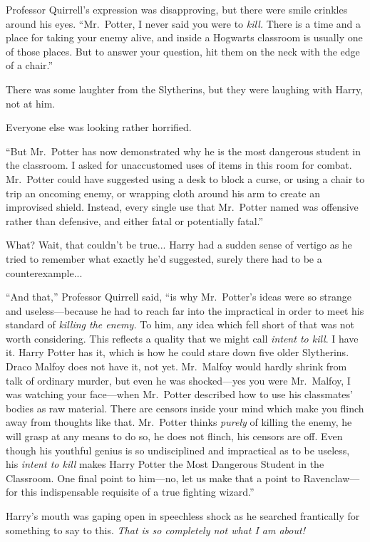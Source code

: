 Professor Quirrell’s expression was disapproving, but there were smile crinkles around his eyes. “Mr.~Potter, I never said you were to \emph{kill.} There is a time and a place for taking your enemy alive, and inside a Hogwarts classroom is usually one of those places. But to answer your question, hit them on the neck with the edge of a chair.”

There was some laughter from the Slytherins, but they were laughing with Harry, not at him.

Everyone else was looking rather horrified.

“But Mr.~Potter has now demonstrated why he is the most dangerous student in the classroom. I asked for unaccustomed uses of items in this room for combat. Mr.~Potter could have suggested using a desk to block a curse, or using a chair to trip an oncoming enemy, or wrapping cloth around his arm to create an improvised shield. Instead, every single use that Mr.~Potter named was offensive rather than defensive, and either fatal or potentially fatal.”

What? Wait, that couldn’t be true... Harry had a sudden sense of vertigo as he tried to remember what exactly he’d suggested, surely there had to be a counterexample...

“And that,” Professor Quirrell said, “is why Mr.~Potter’s ideas were so strange and useless—because he had to reach far into the impractical in order to meet his standard of \emph{killing the enemy.} To him, any idea which fell short of that was not worth considering. This reflects a quality that we might call \emph{intent to kill}. I have it. Harry Potter has it, which is how he could stare down five older Slytherins. Draco Malfoy does not have it, not yet. Mr.~Malfoy would hardly shrink from talk of ordinary murder, but even he was shocked—yes you were Mr.~Malfoy, I was watching your face—when Mr.~Potter described how to use his classmates’ bodies as raw material. There are censors inside your mind which make you flinch away from thoughts like that. Mr.~Potter thinks \emph{purely} of killing the enemy, he will grasp at any means to do so, he does not flinch, his censors are off. Even though his youthful genius is so undisciplined and impractical as to be useless, his \emph{intent to kill} makes Harry Potter the Most Dangerous Student in the Classroom. One final point to him—no, let us make that a point to Ravenclaw—for this indispensable requisite of a true fighting wizard.”

Harry’s mouth was gaping open in speechless shock as he searched frantically for something to say to this. \emph{That is so completely not what I am about!}

